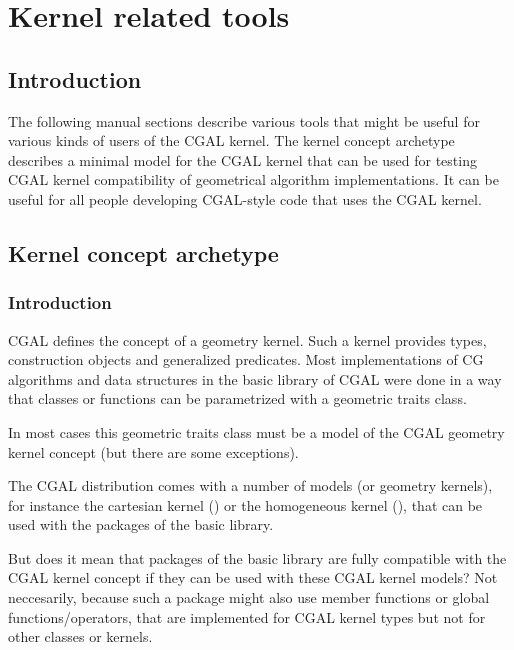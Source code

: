 \chapter{Kernel related tools}

\section{Introduction}

The following manual sections describe various tools that might be useful for various kinds of users of the
CGAL kernel. The kernel concept archetype describes a minimal model for the CGAL kernel that can be used
for testing CGAL kernel compatibility of geometrical algorithm implementations. It can be useful for
all people developing CGAL-style code that uses the CGAL kernel.


\section{Kernel concept archetype}

\subsection{Introduction}

CGAL defines the concept of a geometry
kernel. Such a kernel provides types, construction objects and generalized
predicates. Most implementations of CG algorithms and data structures 
in the basic library of CGAL were done in a way that classes or functions can be
parametrized with a geometric traits class. 

In most cases this geometric traits class must be a model of the CGAL geometry kernel concept
(but there are some exceptions).

The CGAL distribution comes with a number of models (or geometry kernels), for instance
the cartesian kernel () or the homogeneous kernel (),
that can be used with the packages of the basic library.

But does it mean that packages of the basic library are fully compatible with the CGAL kernel concept
if they can be used with these CGAL kernel models? Not neccesarily, because such a package
might also use member functions or global functions/operators, that are implemented for CGAL kernel types but
not for other classes or kernels.

